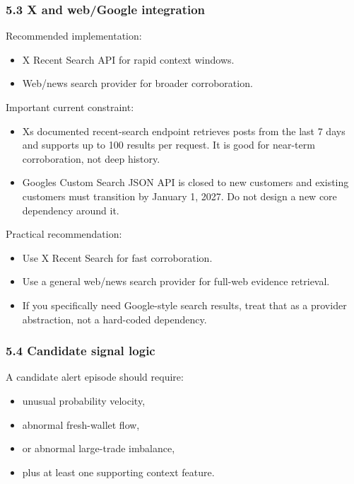 \documentclass[
]{article}
\providecommand{\tightlist}{%
  \setlength{\itemsep}{0pt}\setlength{\parskip}{0pt}}
\begin{document}
\subsubsection{5.3 X and web/Google
integration}\label{53-x-and-webgoogle-integration}

Recommended implementation:

\begin{itemize}
\tightlist
\item
  X Recent Search API for rapid context windows.
\item
  Web/news search provider for broader corroboration.
\end{itemize}

Important current constraint:

\begin{itemize}
\tightlist
\item
  X\textquotesingle s documented recent-search endpoint retrieves posts
  from the last 7 days and supports up to 100 results per request. It is
  good for near-term corroboration, not deep history.
\item
  Google\textquotesingle s Custom Search JSON API is closed to new
  customers and existing customers must transition by January 1, 2027.
  Do not design a new core dependency around it.
\end{itemize}

Practical recommendation:

\begin{itemize}
\tightlist
\item
  Use X Recent Search for fast corroboration.
\item
  Use a general web/news search provider for full-web evidence
  retrieval.
\item
  If you specifically need Google-style search results, treat that as a
  provider abstraction, not a hard-coded dependency.
\end{itemize}

\subsubsection{5.4 Candidate signal
logic}\label{54-candidate-signal-logic}

A candidate alert episode should require:

\begin{itemize}
\tightlist
\item
  unusual probability velocity,
\item
  abnormal fresh-wallet flow,
\item
  or abnormal large-trade imbalance,
\item
  plus at least one supporting context feature.
\end{itemize}
\end{document}
